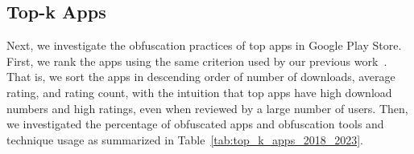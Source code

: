\begin{table}[]
\caption{Developers with only one app}
\label{tab:my-table}
\end{table}

\subsection{Top-k Apps}

Next, we investigate the obfuscation practices of top apps in Google Play Store. First, we rank the apps using the same criterion used by our previous work~\cite{rajasegaran2019multi, karunanayake2020multi, seneviratne2015early}. That is, we sort the apps in descending order of number of downloads, average rating, and rating count, with the intuition that top apps have high download numbers and high ratings, even when reviewed by a large number of users. Then, we investigated the percentage of obfuscated apps and obfuscation tools and technique usage as summarized in Table~\ref{tab:top_k_apps_2018_2023}.

